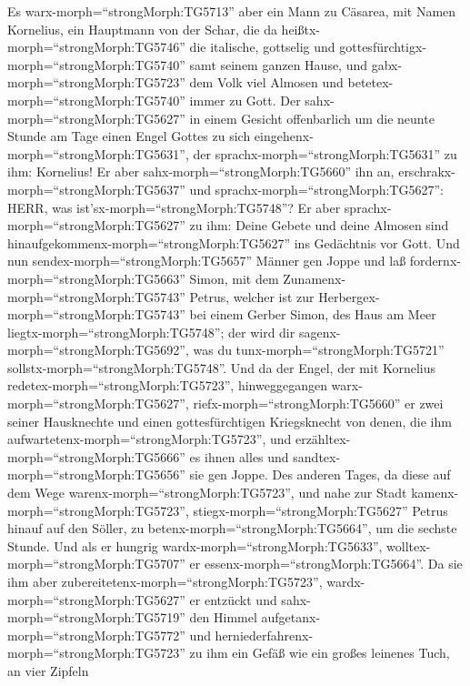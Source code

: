  Es warx-morph=``strongMorph:TG5713'' aber ein Mann zu
Cäsarea, mit Namen Kornelius, ein Hauptmann von der Schar, die da
heißtx-morph=``strongMorph:TG5746'' die italische, 
gottselig und gottesfürchtigx-morph=``strongMorph:TG5740'' samt seinem
ganzen Hause, und gabx-morph=``strongMorph:TG5723'' dem Volk viel
Almosen und betetex-morph=``strongMorph:TG5740'' immer zu Gott.
 Der sahx-morph=``strongMorph:TG5627'' in einem Gesicht
offenbarlich um die neunte Stunde am Tage einen Engel Gottes zu sich
eingehenx-morph=``strongMorph:TG5631'', der
sprachx-morph=``strongMorph:TG5631'' zu ihm: Kornelius!  Er
aber sahx-morph=``strongMorph:TG5660'' ihn an,
erschrakx-morph=``strongMorph:TG5637'' und
sprachx-morph=``strongMorph:TG5627'': HERR, was
ist'sx-morph=``strongMorph:TG5748''? Er aber
sprachx-morph=``strongMorph:TG5627'' zu ihm: Deine Gebete und deine
Almosen sind hinaufgekommenx-morph=``strongMorph:TG5627'' ins Gedächtnis
vor Gott.  Und nun sendex-morph=``strongMorph:TG5657''
Männer gen Joppe und laß fordernx-morph=``strongMorph:TG5663'' Simon,
mit dem Zunamenx-morph=``strongMorph:TG5743'' Petrus, 
welcher ist zur Herbergex-morph=``strongMorph:TG5743'' bei einem Gerber
Simon, des Haus am Meer liegtx-morph=``strongMorph:TG5748''; der wird
dir sagenx-morph=``strongMorph:TG5692'', was du
tunx-morph=``strongMorph:TG5721'' sollstx-morph=``strongMorph:TG5748''.
 Und da der Engel, der mit Kornelius
redetex-morph=``strongMorph:TG5723'', hinweggegangen
warx-morph=``strongMorph:TG5627'', riefx-morph=``strongMorph:TG5660'' er
zwei seiner Hausknechte und einen gottesfürchtigen Kriegsknecht von
denen, die ihm aufwartetenx-morph=``strongMorph:TG5723'', 
und erzähltex-morph=``strongMorph:TG5666'' es ihnen alles und
sandtex-morph=``strongMorph:TG5656'' sie gen Joppe.  Des
anderen Tages, da diese auf dem Wege
warenx-morph=``strongMorph:TG5723'', und nahe zur Stadt
kamenx-morph=``strongMorph:TG5723'', stiegx-morph=``strongMorph:TG5627''
Petrus hinauf auf den Söller, zu betenx-morph=``strongMorph:TG5664'', um
die sechste Stunde.  Und als er hungrig
wardx-morph=``strongMorph:TG5633'', wolltex-morph=``strongMorph:TG5707''
er essenx-morph=``strongMorph:TG5664''. Da sie ihm aber
zubereitetenx-morph=``strongMorph:TG5723'',
wardx-morph=``strongMorph:TG5627'' er entzückt  und
sahx-morph=``strongMorph:TG5719'' den Himmel
aufgetanx-morph=``strongMorph:TG5772'' und
herniederfahrenx-morph=``strongMorph:TG5723'' zu ihm ein Gefäß wie ein
großes leinenes Tuch, an vier Zipfeln
